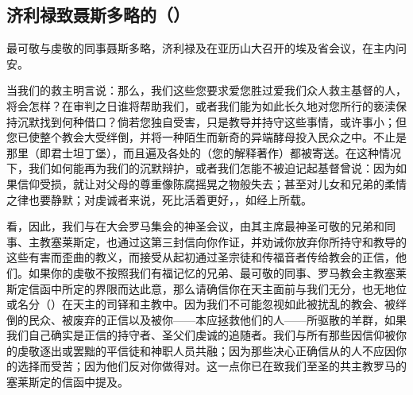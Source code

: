 \par

\par


\subsection{济利禄致聂斯多略的（）}

最可敬与虔敬的同事聂斯多略，济利禄及在亚历山大召开的埃及省会议，在主内问安。\par

当我们的救主明言说：那么，我们这些您要求爱您胜过爱我们众人救主基督的人，将会怎样？在审判之日谁将帮助我们，或者我们能为如此长久地对您所行的亵渎保持沉默找到何种借口？倘若您独自受害，只是教导并持守这些事情，或许事小；但您已使整个教会大受绊倒，并将一种陌生而新奇的异端酵母投入民众之中。不止是那里（即君士坦丁堡），而且遍及各处的（您的解释著作）都被寄送。在这种情况下，我们如何能再为我们的沉默辩护，或者我们怎能不被迫记起基督曾说：因为如果信仰受损，就让对父母的尊重像陈腐摇晃之物般失去；甚至对儿女和兄弟的柔情之律也要静默；对虔诚者来说，死比活着更好，，如经上所载。\par

看，因此，我们与在大会罗马集会的神圣会议，由其主席最神圣可敬的兄弟和同事、主教塞莱斯定，也通过这第三封信向你作证，并劝诫你放弃你所持守和教导的这些有害而歪曲的教义，而接受从起初通过圣宗徒和传福音者传给教会的正信，他们。如果你的虔敬不按照我们有福记忆的兄弟、最可敬的同事、罗马教会主教塞莱斯定信函中所定的界限而达此意，那么请确信你在天主面前与我们无分，也无地位或名分（）在天主的司铎和主教中。因为我们不可能忽视如此被扰乱的教会、被绊倒的民众、被废弃的正信以及被你——本应拯救他们的人——所驱散的羊群，如果我们自己确实是正信的持守者、圣父们虔诚的追随者。我们与所有那些因信仰被你的虔敬逐出或罢黜的平信徒和神职人员共融；因为那些决心正确信从的人不应因你的选择而受苦；因为他们反对你做得对。这一点你已在致我们至圣的共主教罗马的塞莱斯定的信函中提及。\par

